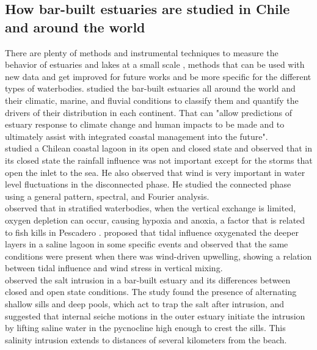 \documentclass[tesis.tex]{subfiles}
\begin{document}
\subsection{How bar-built estuaries are studied in Chile and around the world}

There are plenty of methods and instrumental techniques to measure the behavior of estuaries and lakes at a small scale \citep{Wuest2003}, methods that can be used with new data and get improved for future works and be more specific for the different types of waterbodies. \cite{mcsweeney2017intermittently} studied the bar-built estuaries all around the world and their climatic, marine, and fluvial conditions to classify them and quantify the drivers of their distribution in each continent. That can "allow predictions of estuary response to climate change and human impacts to be made and to ultimately assist with integrated coastal management into the future".\\

\cite{dussaillant2009} studied a Chilean coastal lagoon in its open and closed state and observed that in its closed state the rainfall influence was not important except for the storms that open the inlet to the sea. He also observed that wind is very important in water level fluctuations in the disconnected phase. He studied the connected phase using a general pattern, spectral, and Fourier analysis.\\

\cite{Gale2006} observed that in stratified waterbodies, when the vertical exchange is limited, oxygen depletion can occur, causing hypoxia and anoxia, a factor that is related to fish kills in Pescadero \citep{largier2015}. \cite{Kelly2018} proposed that tidal influence oxygenated the deeper layers in a saline lagoon in some specific events and observed that the same conditions were present when there was wind-driven upwelling, showing a relation between tidal influence and wind stress in vertical mixing.\\

\cite{Behrens2016} observed the salt intrusion in a bar-built estuary and its differences between closed and open state conditions. The study found the presence of alternating shallow sills and deep pools, which act to trap the salt after intrusion, and suggested that internal seiche motions in the outer estuary initiate the intrusion by lifting saline water in the pycnocline high enough to crest the sills. This salinity intrusion extends to distances of several kilometers from the beach.\\
\end{document}
